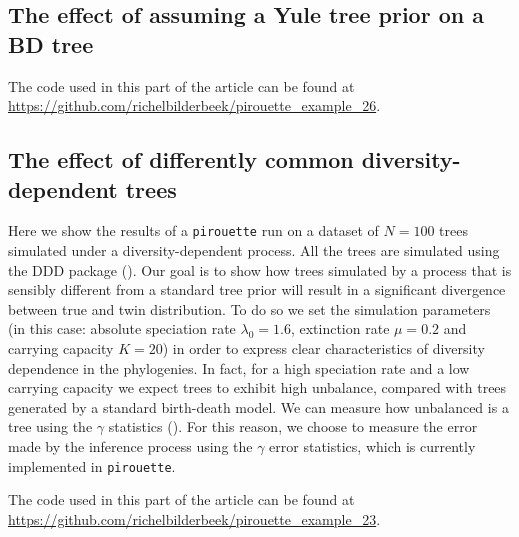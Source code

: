 \subsection{The effect of assuming a Yule tree prior on a BD tree}

The code used in this part of the article can be found at 
\url{https://github.com/richelbilderbeek/pirouette_example_26}.



\subsection{The effect of differently common diversity-dependent trees}

Here we show the results of a \verb;pirouette; run on a dataset of $N = 100$  trees simulated under a diversity-dependent process. All the trees are simulated using the DDD package (\cite{DDD}). Our goal is to show how trees simulated by a process that is sensibly different from a standard tree prior will result in a significant divergence between true and twin distribution. To do so we set the simulation parameters (in this case: absolute speciation rate $\lambda_0 = 1.6$, extinction rate $\mu = 0.2$ and carrying capacity $K = 20$) in order to express clear characteristics of diversity dependence in the phylogenies. In fact, for a high speciation rate and a low carrying capacity we expect trees to exhibit high unbalance, compared with trees generated by a standard birth-death model. We can measure how unbalanced is a tree using the $\gamma$ statistics (\cite{pybus2000testing}). For this reason, we choose to measure the error made by the inference process using the $\gamma$ error statistics, which is currently implemented in \verb;pirouette;.

The code used in this part of the article can be found at 
\url{https://github.com/richelbilderbeek/pirouette_example_23}.

